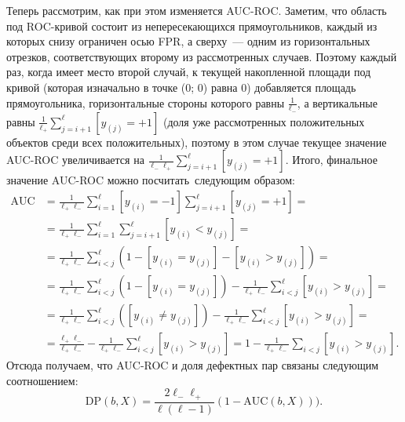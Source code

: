 \documentclass[12pt,a4paper]{article}
\begin{document}
\begin{esSolution}
		\begin{figure}[H]
			\label{ris:image}
		\end{figure}
	
	
	Теперь рассмотрим, как при этом изменяется AUC-ROC. Заметим, что область под ROC-кривой состоит из непересекающихся прямоугольников, каждый из которых снизу ограничен осью FPR, а сверху~--- одним из горизонтальных отрезков, соответствующих второму из рассмотренных случаев. Поэтому каждый раз, когда имеет место второй случай, к текущей накопленной площади под кривой (которая изначально в точке (0; 0) равна 0) добавляется площадь прямоугольника, горизонтальные стороны которого равны $\frac{1}{\ell_-}$, а вертикальные равны $\frac{1}{\ell_+} \sum_{j=i+1}^{\ell} [y_{(j)} = +1]$ (доля уже рассмотренных положительных объектов среди всех положительных), поэтому в этом случае текущее значение AUC-ROC увеличивается на $\frac{1}{\ell_- \ell_+} \sum_{j=i+1}^\ell [y_{(j)} = +1].$
	Итого, финальное значение AUC-ROC можно посчитать~следующим образом:
       \begin{align*}
      \text{AUC} &= \frac{1}{\ell_{+} \ell_{-}} \sum_{i = 1}^{\ell} [y_{(i)} = -1] \sum_{j = i + 1}^{\ell} [y_{(j)} = +1] =\\
       &= \frac{1}{\ell_{+} \ell_{-}}
        \sum_{i = 1}^{\ell} \sum_{j = i + 1}^{\ell} [y_{(i)} < y_{(j)}] =\\
        &= \frac{1}{\ell_{+} \ell_{-}} \sum_{i < j}^{\ell} (1 - [y_{(i)} = y_{(j)}] - [y_{(i)} > y_{(j)}]) =\\
        &= \frac{1}{\ell_{+} \ell_{-}} \sum_{i < j}^{\ell} (1 - [y_{(i)} = y_{(j)}]) - \frac{1}{\ell_{+} \ell_{-}} \sum_{i < j}^{\ell} [y_{(i)} > y_{(j)}] =\\
        &= \frac{1}{\ell_{+} \ell_{-}} \sum_{i < j}^{\ell} ([y_{(i)} \ne y_{(j)}]) - \frac{1}{\ell_{+} \ell_{-}} \sum_{i < j}^{\ell} [y_{(i)} > y_{(j)}] =\\
        &=
        \frac{\ell_{+} \ell_{-}}{\ell_{+} \ell_{-}}
        - \frac{1}{\ell_{+} \ell_{-}}
        \sum_{i < j}^{\ell}
        [y_{(i)} > y_{(j)}]
        = 1
        -
        \frac{1}{\ell_{+} \ell_{-}}
        \sum_{i < j}
        [y_{(i)} > y_{(j)}].
\end{align*}
	Отсюда получаем, что AUC-ROC и доля дефектных пар связаны следующим соотношением:
	$$\text{DP}(b, X) = \frac{2 \ell_- \ell_+}{\ell (\ell -1)} (1 - \text{AUC} (b, X))).$$
	\vspace{0.5cm}
	\end{esSolution}
	
\end{document}
